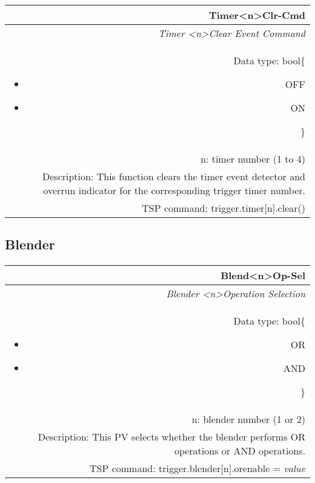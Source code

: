 \documentclass[openany]{article}
\begin{document}
		\begin{tabular}{N}
			\hline
			\bfseries Timer{\textless n\textgreater}Clr-Cmd\label{pv:timerclr-cmd} \\ \hline
			\emph{Timer \textless n\textgreater Clear Event Command} \\
			Data type: bool\{\begin{itemize}[noitemsep]
				\small
				\item[] OFF
				\item[] ON
			\end{itemize}\} \\
			n: timer number (1 to 4) \\
			Description: This function clears the timer event detector and overrun indicator for the corresponding trigger timer number. \\
			TSP command: trigger.timer[n].clear()
		\end{tabular}

	\subsection{Blender}\label{pvgroup:blender}

		\paragraph{} %

		\begin{tabular}{N}
			\hline
			\bfseries Blend{\textless n\textgreater}Op-Sel\label{pv:blendop-sel} \\ \hline
			\emph{Blender \textless n\textgreater Operation Selection} \\
			Data type: bool\{\begin{itemize}[noitemsep]
				\small
				\item[] OR
				\item[] AND
			\end{itemize}\} \\
			n: blender number (1 or 2) \\
			Description: This PV selects whether the blender performs OR operations or AND operations. \\
			TSP command: trigger.blender[n].orenable = \emph{value}
		\end{tabular}
\end{document}
